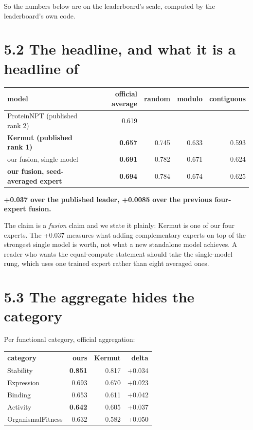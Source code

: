 \documentclass[sigconf,review,nonacm]{acmart}
\begin{document}
So the numbers below are on the leaderboard's scale, computed by the leaderboard's own code.

\hypertarget{the-headline-and-what-it-is-a-headline-of}{%
\section{5.2 The headline, and what it is a headline of}\label{the-headline-and-what-it-is-a-headline-of}}

\begin{table}[t]
\centering
\small
\begin{tabular}{lrrrr}
\hline
model & official average & random & modulo & contiguous \\
\hline
ProteinNPT (published rank 2) & 0.619 &  &  &  \\
\textbf{Kermut (published rank 1)} & \textbf{0.657} & 0.745 & 0.633 & 0.593 \\
our fusion, single model & \textbf{0.691} & 0.782 & 0.671 & 0.624 \\
\textbf{our fusion, seed-averaged expert} & \textbf{0.694} & 0.784 & 0.674 & 0.625 \\
\hline
\end{tabular}
\end{table}

\textbf{+0.037 over the published leader, +0.0085 over the previous four-expert fusion.}

The claim is a \emph{fusion} claim and we state it plainly: Kermut is one of our four experts. The +0.037
measures what adding complementary experts on top of the strongest single model is worth, not what a new
standalone model achieves. A reader who wants the equal-compute statement should take the single-model
rung, which uses one trained expert rather than eight averaged ones.

\hypertarget{the-aggregate-hides-the-category}{%
\section{5.3 The aggregate hides the category}\label{the-aggregate-hides-the-category}}

Per functional category, official aggregation:

\begin{table}[t]
\centering
\small
\begin{tabular}{lrrr}
\hline
category & ours & Kermut & delta \\
\hline
Stability & \textbf{0.851} & 0.817 & +0.034 \\
Expression & 0.693 & 0.670 & +0.023 \\
Binding & 0.653 & 0.611 & +0.042 \\
Activity & \textbf{0.642} & 0.605 & +0.037 \\
OrganismalFitness & 0.632 & 0.582 & +0.050 \\
\hline
\end{tabular}
\end{table}
\end{document}
